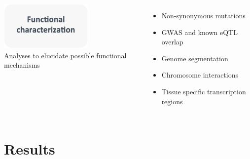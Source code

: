 \documentclass{beamer}
\begin{document}
\begin{frame}
\begin{columns}[c]
\includegraphics[width=4.5cm]{images/func.png} \\
Analyses to elucidate possible functional mechanisms
\begin{itemize}
\item Non-synonymous mutations
\vspace{0.1cm}
\item GWAS and known eQTL overlap
\vspace{0.1cm}
\item Genome segmentation
\vspace{0.1cm}
\item Chromosome interactions
\vspace{0.1cm}
\item Tissue specific transcription regions
\end{itemize}
\end{columns}
\end{frame}


\section{Results}
\end{document}
